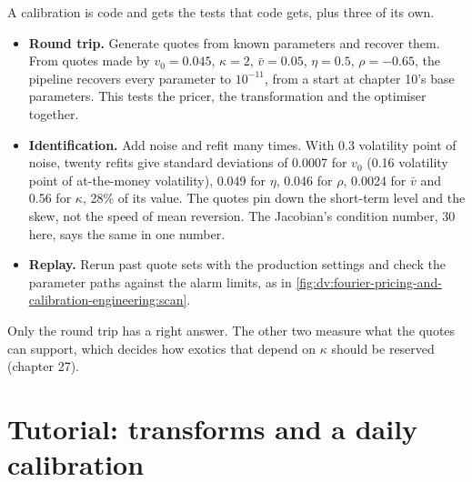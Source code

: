 A calibration is code and gets the tests that code gets, plus three of its own.
\begin{itemize}
\item \textbf{Round trip.} Generate quotes from known parameters and recover them. From quotes made by $v_0=0.045$, $\kappa=2$, $\bar v=0.05$,
$\eta=0.5$, $\rho=-0.65$, the pipeline recovers every parameter to $10^{-11}$, from a start at chapter 10's base parameters. This tests the
pricer, the transformation and the optimiser together.
\item \textbf{Identification.} Add noise and refit many times. With 0.3 volatility point of noise, twenty refits give standard deviations of
0.0007 for $v_0$ (0.16 volatility point of at-the-money volatility), 0.049 for $\eta$, 0.046 for $\rho$, 0.0024 for $\bar v$ and 0.56 for
$\kappa$, 28\% of its value. The quotes pin down the short-term level and the skew, not the speed of mean reversion. The Jacobian's condition
number, 30 here, says the same in one number.
\item \textbf{Replay.} Rerun past quote sets with the production settings and check the parameter paths against the alarm limits, as in
\cref{fig:dv:fourier-pricing-and-calibration-engineering:scan}.
\end{itemize}
Only the round trip has a right answer. The other two measure what the quotes can support, which decides how exotics that depend on $\kappa$
should be reserved (chapter 27).

\section{Tutorial: transforms and a daily calibration}\label{tut:dv:fourier-pricing-and-calibration-engineering:tut}

